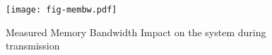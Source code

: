 \begin{figure}[H]
\texttt{[image: fig-membw.pdf]}
\caption{Measured Memory Bandwidth Impact on the system during transmission}
\label{fig:membw}
\end{figure}
